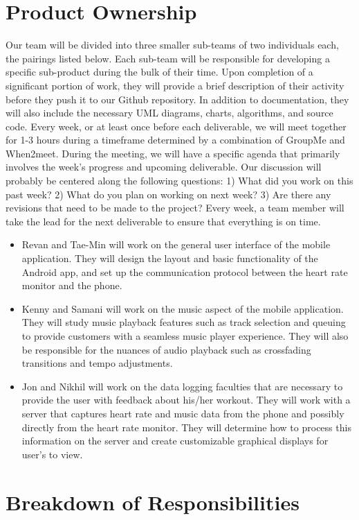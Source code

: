 \documentclass[letterpaper,english, 12pt]{scrreprt}
\begin{document}
\section{Product Ownership}
Our team will be divided into three smaller sub-teams of two individuals each, the pairings listed below. Each sub-team will be responsible for developing a specific sub-product during the bulk of their time. Upon completion of a significant portion of work, they will provide a brief description of their activity before they push it to our Github repository. In addition to documentation, they will also include the necessary UML diagrams, charts, algorithms, and source code. Every week, or at least once before each deliverable, we will meet together for 1-3 hours during a timeframe determined by a combination of GroupMe and When2meet. During the meeting, we will have a specific agenda that primarily involves the week's progress and upcoming deliverable. Our discussion will probably be centered along the following questions: 1) What did you work on this past week? 2) What do you plan on working on next week? 3) Are there any revisions that need to be made to the project? Every week, a team member will take the lead for the next deliverable to ensure that everything is on time.

\begin{itemize}
	\item Revan and Tae-Min will work on the general user interface of the mobile application. They will design the layout and basic functionality of the Android app, and set up the communication protocol between the heart rate monitor and the phone. 
	\item Kenny and Samani will work on the music aspect of the mobile application. They will study music playback features such as track selection and queuing to provide customers with a seamless music player experience. They will also be responsible for the nuances of audio playback such as crossfading transitions and tempo adjustments.
	\item Jon and Nikhil will work on the data logging faculties that are necessary to provide the user with feedback about his/her workout. They will work with a server that captures heart rate and music data from the phone and possibly directly from the heart rate monitor. They will determine how to process this information on the server and create customizable graphical displays for user's to view.
\end{itemize}


\section{Breakdown of Responsibilities}
\end{document}
